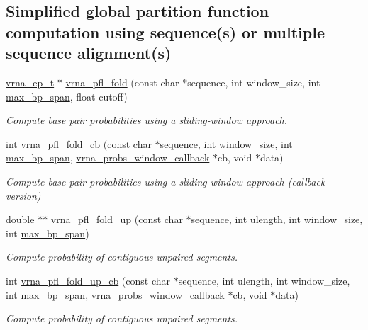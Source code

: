 \subsection*{Simplified global partition function computation using sequence(s) or multiple sequence alignment(s)}
\begin{DoxyCompactItemize}
\item 
\hyperlink{group__struct__utils__plist_gab9ac98ab55ded9fb90043b024b915aca}{vrna\+\_\+ep\+\_\+t} $\ast$ \hyperlink{group__part__func__window_ga6267230f20cab0e2315375310b4dad85}{vrna\+\_\+pfl\+\_\+fold} (const char $\ast$sequence, int window\+\_\+size, int \hyperlink{group__model__details_ga18df869af0d70101106458fc3f027806}{max\+\_\+bp\+\_\+span}, float cutoff)
\begin{DoxyCompactList}\small\item\em Compute base pair probabilities using a sliding-\/window approach. \end{DoxyCompactList}\item 
int \hyperlink{group__part__func__window_ga457a60751b2a5225477e3b7735636a5f}{vrna\+\_\+pfl\+\_\+fold\+\_\+cb} (const char $\ast$sequence, int window\+\_\+size, int \hyperlink{group__model__details_ga18df869af0d70101106458fc3f027806}{max\+\_\+bp\+\_\+span}, \hyperlink{group__part__func__window_gabe710a1182e6db69cc75329dfc9bed67}{vrna\+\_\+probs\+\_\+window\+\_\+callback} $\ast$cb, void $\ast$data)
\begin{DoxyCompactList}\small\item\em Compute base pair probabilities using a sliding-\/window approach (callback version) \end{DoxyCompactList}\item 
double $\ast$$\ast$ \hyperlink{group__part__func__window_ga1dd5c51b797c961124912e289bff553a}{vrna\+\_\+pfl\+\_\+fold\+\_\+up} (const char $\ast$sequence, int ulength, int window\+\_\+size, int \hyperlink{group__model__details_ga18df869af0d70101106458fc3f027806}{max\+\_\+bp\+\_\+span})
\begin{DoxyCompactList}\small\item\em Compute probability of contiguous unpaired segments. \end{DoxyCompactList}\item 
int \hyperlink{group__part__func__window_gac3251d3da0238d6d9ffdd6703b00f1d3}{vrna\+\_\+pfl\+\_\+fold\+\_\+up\+\_\+cb} (const char $\ast$sequence, int ulength, int window\+\_\+size, int \hyperlink{group__model__details_ga18df869af0d70101106458fc3f027806}{max\+\_\+bp\+\_\+span}, \hyperlink{group__part__func__window_gabe710a1182e6db69cc75329dfc9bed67}{vrna\+\_\+probs\+\_\+window\+\_\+callback} $\ast$cb, void $\ast$data)
\begin{DoxyCompactList}\small\item\em Compute probability of contiguous unpaired segments. \end{DoxyCompactList}\end{DoxyCompactItemize}


